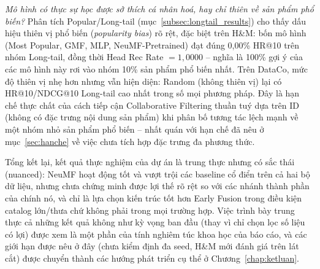 \textit{Mô hình có thực sự học được sở thích cá nhân hoá, hay chỉ thiên về sản phẩm phổ biến?} Phân tích Popular/Long-tail (mục~\ref{subsec:longtail_results}) cho thấy dấu hiệu thiên vị phổ biến (\textit{popularity bias}) rõ rệt, đặc biệt trên H\&M: bốn mô hình (Most Popular, GMF, MLP, NeuMF-Pretrained) đạt đúng 0,00\% HR@10 trên nhóm Long-tail, đồng thời Head Rec Rate $=1{,}0000$ -- nghĩa là 100\% gợi ý của các mô hình này rơi vào nhóm 10\% sản phẩm phổ biến nhất. Trên DataCo, mức độ thiên vị nhẹ hơn nhưng vẫn hiện diện: Random (không thiên vị) lại có HR@10/NDCG@10 Long-tail cao nhất trong số mọi phương pháp. Đây là hạn chế thực chất của cách tiếp cận Collaborative Filtering thuần tuý dựa trên ID (không có đặc trưng nội dung sản phẩm) khi phân bố tương tác lệch mạnh về một nhóm nhỏ sản phẩm phổ biến -- nhất quán với hạn chế đã nêu ở mục~\ref{sec:hanche} về việc chưa tích hợp đặc trưng đa phương thức.

Tổng kết lại, kết quả thực nghiệm của dự án là trung thực nhưng có sắc thái (nuanced): NeuMF hoạt động tốt và vượt trội các baseline cổ điển trên cả hai bộ dữ liệu, nhưng chưa chứng minh được lợi thế rõ rệt so với các nhánh thành phần của chính nó, và chỉ là lựa chọn kiến trúc tốt hơn Early Fusion trong điều kiện catalog lớn/thưa chứ không phải trong mọi trường hợp. Việc trình bày trung thực cả những kết quả không như kỳ vọng ban đầu (thay vì chỉ chọn lọc số liệu có lợi) được xem là một phần của tính nghiêm túc khoa học của báo cáo, và các giới hạn được nêu ở đây (chưa kiểm định đa seed, H\&M mới đánh giá trên lát cắt) được chuyển thành các hướng phát triển cụ thể ở Chương~\ref{chap:ketluan}.